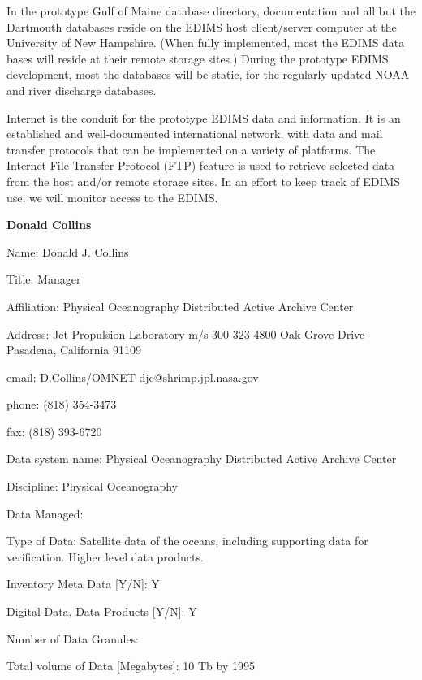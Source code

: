 	In the prototype Gulf of Maine database directory, documentation and 
all but the Dartmouth databases reside on the EDIMS host client/server 
computer at the University of New Hampshire.  (When fully implemented, 
most the EDIMS data bases will reside at their remote storage sites.)  
During the prototype EDIMS development, most the databases will be 
static, for the regularly updated NOAA and river discharge databases.

	Internet is the conduit for the prototype EDIMS data and information.  
It is an established and well-documented international network, with data 
and mail transfer protocols that can be implemented on a variety of 
platforms.  The Internet File Transfer Protocol (FTP) feature is used to 
retrieve selected data from the host and/or remote storage sites.  In an 
effort to keep track of EDIMS use, we will monitor access to the EDIMS.
\newpage

\begin{center}
\LARGE
{\bf  Donald Collins}
\end{center}
\large
{}
\normalsize
\smallskip
\begin{description}
\item{Name:}  Donald J. Collins
\item{Title:}  Manager
\item{Affiliation:}  Physical Oceanography Distributed Active Archive 
Center
\item{Address:}  Jet Propulsion Laboratory
			m/s  300-323
			4800 Oak Grove Drive
			Pasadena, California  91109
\item{email:}  D.Collins/OMNET     djc@shrimp.jpl.nasa.gov
\item{phone:}  (818) 354-3473
\item{fax:}  (818) 393-6720
\end{description}
\medskip
\large
{}
\normalsize
\medskip
\begin{description}

\item{Data system name:}  Physical Oceanography Distributed Active 
Archive Center
\item{Discipline:}  Physical Oceanography
\item{Data Managed:}
	\begin{description}
	\item{Type of Data:}  Satellite data of the oceans, including
		supporting data for verification.  Higher level data products.
	\item{Inventory Meta Data [Y/N]:}   Y
	\item{Digital Data, Data Products [Y/N]:}  Y
	\item{Number of Data Granules:}
	\item{Total volume of Data [Megabytes]:}  10 Tb by 1995
	\end{description}
\end{description}

